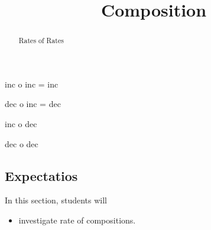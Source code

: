 \documentclass{ximera}
\title{Composition}
\begin{document}
\begin{abstract}
Rates of Rates
\end{abstract}
\maketitle



inc o inc = inc

dec o inc = dec

inc o dec 

dec o dec










\subsection{Expectatios}


\begin{sectionOutcomes}
In this section, students will 

\begin{itemize}
\item investigate rate of compositions.

\end{itemize}
\end{sectionOutcomes}
\end{document}
